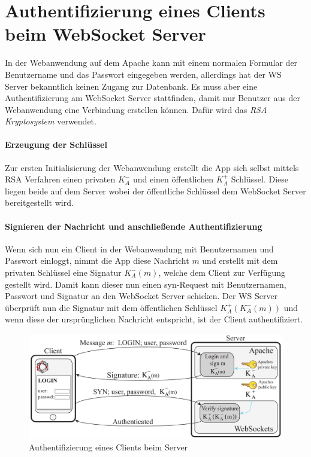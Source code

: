 \section{Authentifizierung eines Clients beim WebSocket Server}
In der Webanwendung auf dem Apache kann mit einem normalen Formular der Benutzername und das Passwort eingegeben werden, allerdings hat der WS Server bekanntlich keinen Zugang zur Datenbank. Es muss aber eine Authentifizierung am WebSocket Server stattfinden, damit nur Benutzer aus der Webanwendung eine Verbindung erstellen können. Dafür wird das \emph{RSA Kryptosystem} verwendet.

\paragraph{Erzeugung der Schlüssel}
Zur ersten Initialisierung der Webanwendung erstellt die App sich selbst mittels RSA Verfahren einen privaten $K^-_A$ und einen öffentlichen $K^+_A$ Schlüssel. Diese liegen beide auf dem Server wobei der öffentliche Schlüssel dem WebSocket Server bereitgestellt wird.

\paragraph{Signieren der Nachricht und anschließende Authentifizierung}
Wenn sich nun ein Client in der Webanwendung mit Benutzernamen und Passwort einloggt, nimmt die App diese Nachricht $m$ und erstellt mit dem privaten Schlüssel eine Signatur $K^-_A(m)$, welche dem Client zur Verfügung gestellt wird. Damit kann dieser nun einen syn-Request mit Benutzernamen, Passwort und Signatur an den WebSocket Server schicken. Der WS Server überprüft nun die Signatur mit dem öffentlichen Schlüssel $K^+_A(K^-_A(m))$ und wenn diese der ursprünglichen Nachricht entspricht, ist der Client authentifiziert.

\begin{figure}[!ht]
	\centering
	\includegraphics[width=15cm]{fig/publicprivate}
	\caption{Authentifizierung eines Clients beim Server}
\end{figure}

